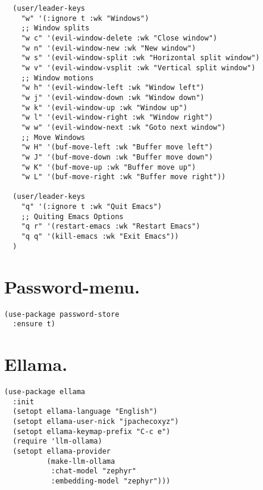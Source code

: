 \documentclass[11pt]{article}
\begin{document}
\begin{verbatim}
  (user/leader-keys
    "w" '(:ignore t :wk "Windows")
    ;; Window splits
    "w c" '(evil-window-delete :wk "Close window")
    "w n" '(evil-window-new :wk "New window")
    "w s" '(evil-window-split :wk "Horizontal split window")
    "w v" '(evil-window-vsplit :wk "Vertical split window")
    ;; Window motions
    "w h" '(evil-window-left :wk "Window left")
    "w j" '(evil-window-down :wk "Window down")
    "w k" '(evil-window-up :wk "Window up")
    "w l" '(evil-window-right :wk "Window right")
    "w w" '(evil-window-next :wk "Goto next window")
    ;; Move Windows
    "w H" '(buf-move-left :wk "Buffer move left")
    "w J" '(buf-move-down :wk "Buffer move down")
    "w K" '(buf-move-up :wk "Buffer move up")
    "w L" '(buf-move-right :wk "Buffer move right"))

  (user/leader-keys
    "q" '(:ignore t :wk "Quit Emacs")
    ;; Quiting Emacs Options
    "q r" '(restart-emacs :wk "Restart Emacs")
    "q q" '(kill-emacs :wk "Exit Emacs"))
  )
\end{verbatim}
\section{Password-menu.}
\label{sec:org976e42b}
\begin{verbatim}
(use-package password-store
  :ensure t)
\end{verbatim}
\section{Ellama.}
\label{sec:org05ce525}
\begin{verbatim}
(use-package ellama
  :init
  (setopt ellama-language "English")
  (setopt ellama-user-nick "jpachecoxyz")
  (setopt ellama-keymap-prefix "C-c e")
  (require 'llm-ollama)
  (setopt ellama-provider
          (make-llm-ollama
           :chat-model "zephyr"
           :embedding-model "zephyr")))
\end{verbatim}
\end{document}
